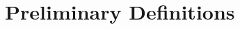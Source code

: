 \newcommand{\lnext}{\ensuremath{\mathbf{X}}}
\newcommand{\lwnext}{\ensuremath{\mathbf{\bar{X}}}}
\newcommand{\luntil}{\ensuremath{\mathbf{U}}}
\newcommand{\lsince}{\ensuremath{\mathbf{S}}}
\newcommand{\lrelease}{\ensuremath{\mathbf{R}}}
\newcommand{\lwuntil}{\ensuremath{\mathbf{W}}}
\newcommand{\lglobally}{\ensuremath{\mathbf{G}}}
\newcommand{\lfuture}{\ensuremath{\mathbf{F}}}
\newcommand{\tnext}{\ensuremath{\mathbf{X}_{I}}}
\newcommand{\twnext}{\ensuremath{\mathbf{\bar{X}_I}}}
\newcommand{\tuntil}{\ensuremath{\mathbf{U}_{I}}}
\newcommand{\tsince}{\ensuremath{\mathbf{S}_{I}}}
\newcommand{\trelease}{\ensuremath{\mathbf{R}_{I}}}
\newcommand{\tglobally}{\ensuremath{\mathbf{G}_{I}}}
\newcommand{\lonce}{\ensuremath{\mathbf{O}}}
\newcommand{\tonce}{\ensuremath{\mathbf{O}_{I}}}

\newcommand{\lyesterday}{\ensuremath{\mathbf{Y}}}
\newcommand{\tyesterday}{\ensuremath{\mathbf{Y}_{I}}}
\newcommand{\lhistorically}{\ensuremath{\mathbf{H}}}
\newcommand{\thistorically}{\ensuremath{\mathbf{H}_{I}}}
\newcommand{\tfuture}{\ensuremath{\mathbf{F}_{I}}}



\section{Preliminary Definitions}
\label{sec:background}


